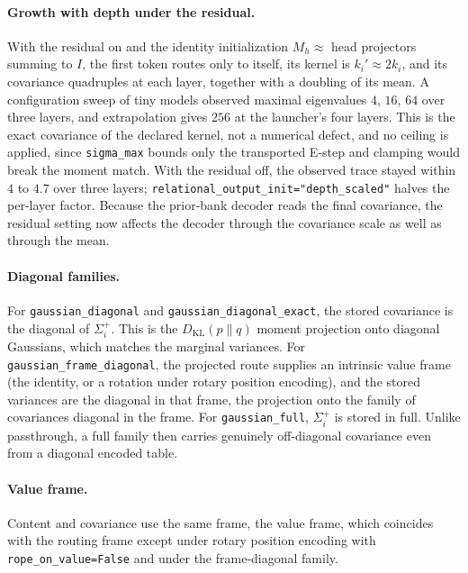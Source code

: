 \documentclass[11pt]{article}
\theoremstyle{definition}
\theoremstyle{remark}
\newcommand{\KL}{D_{\mathrm{KL}}}
\newcommand{\cfg}[1]{\texttt{#1}}
\begin{document}
\paragraph{Growth with depth under the residual.}
With the residual on and the identity initialization $M_h\approx$ head projectors summing to $I$, the first token routes only to itself, its kernel is $k_i'\approx2k_i$, and its covariance quadruples at each layer, together with a doubling of its mean. A configuration sweep of tiny models observed maximal eigenvalues $4$, $16$, $64$ over three layers, and extrapolation gives $256$ at the launcher's four layers. This is the exact covariance of the declared kernel, not a numerical defect, and no ceiling is applied, since \cfg{sigma\_max} bounds only the transported E-step and clamping would break the moment match. With the residual off, the observed trace stayed within $4$ to $4.7$ over three layers; \cfg{relational\_output\_init="depth\_scaled"} halves the per-layer factor. Because the prior-bank decoder reads the final covariance, the residual setting now affects the decoder through the covariance scale as well as through the mean.

\paragraph{Diagonal families.}
For \cfg{gaussian\_diagonal} and \cfg{gaussian\_diagonal\_exact}, the stored covariance is the diagonal of $\Sigma_i^{+}$. This is the $\KL(p\|q)$ moment projection onto diagonal Gaussians, which matches the marginal variances. For \cfg{gaussian\_frame\_diagonal}, the projected route supplies an intrinsic value frame (the identity, or a rotation under rotary position encoding), and the stored variances are the diagonal in that frame, the projection onto the family of covariances diagonal in the frame. For \cfg{gaussian\_full}, $\Sigma_i^{+}$ is stored in full. Unlike passthrough, a full family then carries genuinely off-diagonal covariance even from a diagonal encoded table.

\paragraph{Value frame.}
Content and covariance use the same frame, the value frame, which coincides with the routing frame except under rotary position encoding with \cfg{rope\_on\_value=False} and under the frame-diagonal family.
\end{document}
